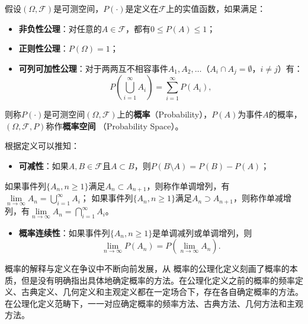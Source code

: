 \begin{definition}[概率与概率空间]
假设$(\Omega,\mathscr F)$是可测空间，$P(\cdot)$是定义在$\mathscr F$上的实值函数，如果满足：
\begin{itemize}
  \item \textbf{非负性公理}：对任意的$A\in \mathscr F$，都有$0\le P(A)\le 1$；
  \item \textbf{正则性公理}：$P(\Omega)=1$；
  \item \textbf{可列可加性公理}：对于两两互不相容事件$A_1,A_2,\ldots$（$A_i\cap A_j = \emptyset$，$i\ne j$）有：
  \[
    P(\bigcup\limits_{i=1}^\infty A_i) = \sum\limits_{i=1}^\infty P(A_i),
  \]
\end{itemize}
则称$P(\cdot)$是可测空间$(\Omega,\mathscr F)$上的\textbf{概率}（Probability），$P(A)$为事件$A$的概率，$(\Omega,\mathscr F, P)$称作\textbf{概率空间}
（Probability Space）。
\end{definition}
根据定义可以推知：
\begin{itemize}
  \item \textbf{可减性}：如果$A,B\in \mathscr F$且$A\subset B$，则$P(B\setminus A) = P(B) - P(A)$；
\end{itemize}
如果事件列$\{A_n, n\ge 1\}$满足$A_n\subset A_{n+1}$，则称作单调增列，有$\lim\limits_{n\rightarrow \infty} A_n = \bigcup\limits_{i=1}^{\infty} A_i$；
如果事件列$\{A_n, n\ge 1\}$满足$A_n\supset A_{n+1}$，则称作单减增列，有$\lim\limits_{n\rightarrow \infty} A_n = \bigcap\limits_{i=1}^{\infty} A_i$。
\begin{itemize}
  \item \textbf{概率连续性}：如果事件列$\{A_n, n\ge 1\}$是单调减列或单调增列，则
  \[
    \lim_{n\rightarrow \infty} P(A_n) = P(\lim_{n\rightarrow \infty} A_n).
  \]
\end{itemize}

概率的解释与定义在争议中不断向前发展，从
概率的公理化定义刻画了概率的本质，但是没有明确指出具体地确定概率的方法。在公理化定义之前的概率的频率定义、古典定义、几何定义和主观定义都在一定场合下，存在各自确定概率的方法。在公理化定义范畴下，一一对应确定概率的频率方法、古典方法、几何方法和主观方法。

